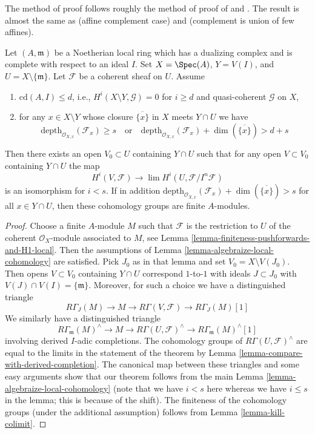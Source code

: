 \begin{theorem}
\label{theorem-algebraization-formal-sections}
\begin{reference}
The method of proof follows roughly the method of
proof of \cite[Theorem 1]{Faltings-algebraisation}
and \cite[Satz 2]{Faltings-uber}.
The result is almost the same as
\cite[Theorem 1.1]{MRaynaud-paper} (affine complement case) and
\cite[Theorem 3.9]{MRaynaud-book} (complement is union of few affines).
\end{reference}
Let $(A, \mathfrak m)$ be a Noetherian local ring which has a
dualizing complex and is complete with respect to an ideal $I$.
Set $X = \Spec(A)$, $Y = V(I)$, and $U = X \setminus \{\mathfrak m\}$.
Let $\mathcal{F}$ be a coherent sheaf on $U$.
Assume
\begin{enumerate}
\item $\text{cd}(A, I) \leq d$, i.e.,
$H^i(X \setminus Y, \mathcal{G}) = 0$ for $i \geq d$ and
quasi-coherent $\mathcal{G}$ on $X$,
\item for any $x \in X \setminus Y$ whose closure $\overline{\{x\}}$
in $X$ meets $Y \cap U$ we have
$$
\text{depth}_{\mathcal{O}_{X, x}}(\mathcal{F}_x) \geq s
\quad\text{or}\quad
\text{depth}_{\mathcal{O}_{X, x}}(\mathcal{F}_x)
+ \dim(\overline{\{x\}}) > d + s
$$
\end{enumerate}
Then there exists an open $V_0 \subset U$ containing $Y \cap U$
such that for any open $V \subset V_0$ containing $Y \cap U$
the map
$$
H^i(V, \mathcal{F}) \to \lim H^i(U, \mathcal{F}/I^n\mathcal{F})
$$
is an isomorphism for $i < s$. If in addition
$
\text{depth}_{\mathcal{O}_{X, x}}(\mathcal{F}_x) +
\dim(\overline{\{x\}}) > s
$
for all $x \in Y \cap U$, then these cohomology groups are finite $A$-modules.
\end{theorem}

\begin{proof}
Choose a finite $A$-module $M$ such that $\mathcal{F}$ is the
restriction to $U$ of the
coherent $\mathcal{O}_X$-module associated to $M$, see
Lemma \ref{lemma-finiteness-pushforwards-and-H1-local}.
Then the assumptions of
Lemma \ref{lemma-algebraize-local-cohomology}
are satisfied.
Pick $J_0$ as in that lemma and set $V_0 = X \setminus V(J_0)$.
Then opens $V \subset V_0$ containing $Y \cap U$
correspond $1$-to-$1$ with ideals $J \subset J_0$ with
$V(J) \cap V(I) = \{\mathfrak m\}$.
Moreover, for such a choice we have a distinguished triangle
$$
R\Gamma_J(M) \to M \to R\Gamma(V, \mathcal{F}) \to
R\Gamma_J(M)[1]
$$
We similarly have a distinguished triangle
$$
R\Gamma_\mathfrak m(M)^\wedge \to
M \to
R\Gamma(U, \mathcal{F})^\wedge \to
R\Gamma_\mathfrak m(M)^\wedge[1]
$$
involving derived $I$-adic completions.
The cohomology groups of $R\Gamma(U, \mathcal{F})^\wedge$ are
equal to the limits in the statement of the theorem by
Lemma \ref{lemma-compare-with-derived-completion}.
The canonical map between these triangles
and some easy arguments show that our
theorem follows from the main Lemma \ref{lemma-algebraize-local-cohomology}
(note that we have $i < s$ here whereas we have
$i \leq s$ in the lemma; this is because of the shift).
The finiteness of the cohomology groups
(under the additional assumption) follows from
Lemma \ref{lemma-kill-colimit}.
\end{proof}

